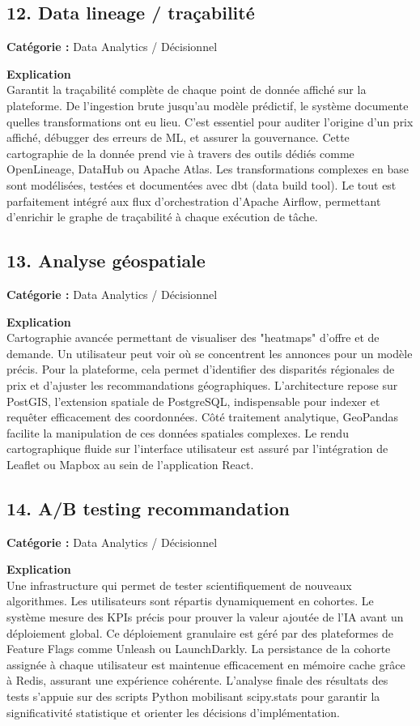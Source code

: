 \documentclass[11pt,a4paper]{article}
\begin{document}
\subsection{12. Data lineage / traçabilité}
\textbf{Catégorie :} Data Analytics / Décisionnel

\textbf{Explication}\\
Garantit la traçabilité complète de chaque point de donnée affiché sur la plateforme. De l'ingestion brute jusqu'au modèle prédictif, le système documente quelles transformations ont eu lieu. C'est essentiel pour auditer l'origine d'un prix affiché, débugger des erreurs de ML, et assurer la gouvernance. Cette cartographie de la donnée prend vie à travers des outils dédiés comme OpenLineage, DataHub ou Apache Atlas. Les transformations complexes en base sont modélisées, testées et documentées avec dbt (data build tool). Le tout est parfaitement intégré aux flux d'orchestration d'Apache Airflow, permettant d'enrichir le graphe de traçabilité à chaque exécution de tâche.

\subsection{13. Analyse géospatiale}
\textbf{Catégorie :} Data Analytics / Décisionnel

\textbf{Explication}\\
Cartographie avancée permettant de visualiser des "heatmaps" d'offre et de demande. Un utilisateur peut voir où se concentrent les annonces pour un modèle précis. Pour la plateforme, cela permet d'identifier des disparités régionales de prix et d'ajuster les recommandations géographiques. L'architecture repose sur PostGIS, l'extension spatiale de PostgreSQL, indispensable pour indexer et requêter efficacement des coordonnées. Côté traitement analytique, GeoPandas facilite la manipulation de ces données spatiales complexes. Le rendu cartographique fluide sur l'interface utilisateur est assuré par l'intégration de Leaflet ou Mapbox au sein de l'application React.

\subsection{14. A/B testing recommandation}
\textbf{Catégorie :} Data Analytics / Décisionnel

\textbf{Explication}\\
Une infrastructure qui permet de tester scientifiquement de nouveaux algorithmes. Les utilisateurs sont répartis dynamiquement en cohortes. Le système mesure des KPIs précis pour prouver la valeur ajoutée de l'IA avant un déploiement global. Ce déploiement granulaire est géré par des plateformes de Feature Flags comme Unleash ou LaunchDarkly. La persistance de la cohorte assignée à chaque utilisateur est maintenue efficacement en mémoire cache grâce à Redis, assurant une expérience cohérente. L'analyse finale des résultats des tests s'appuie sur des scripts Python mobilisant scipy.stats pour garantir la significativité statistique et orienter les décisions d'implémentation.
\end{document}
